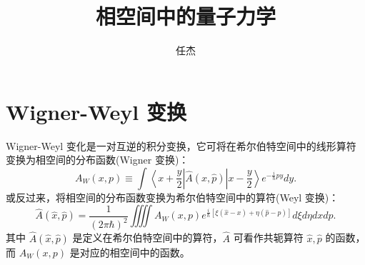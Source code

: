 \documentclass[10pt,UTF8]{ctexart}
\begin{document}
\title{相空间中的量子力学}
\author{任杰}
\date{}

\maketitle


\section*{Wigner-Weyl 变换}
\noindent
Wigner-Weyl 变化是一对互逆的积分变换，它可将在希尔伯特空间中的线形算符变换为相空间的分布函数(Wigner 变换)：
\begin{equation}
	A_W(x,p) \equiv \int \left\langle x+\frac{y}{2}\right|\hat A(\hat x,\hat p) \left|x-\frac{y}{2}\right\rangle e^{-\frac{i}{\hbar}py} dy.
\end{equation}
或反过来，将相空间的分布函数变换为希尔伯特空间中的算符(Weyl 变换)：
\begin{equation}
	\hat A(\hat x,\hat p) = \frac{1}{(2\pi \hbar)^2} \iiiint A_W(x,p) e^{\frac{i}{\hbar}[\xi(\hat x -x)+\eta(\hat p - p)]} d\xi d\eta dx dp.
\end{equation}
其中 $\hat A(\hat x,\hat p)$ 是定义在希尔伯特空间中的算符，$\hat A$ 可看作共轭算符 $\hat x, \hat p$ 的函数，而 $A_W(x,p)$ 是对应的相空间中的函数。
\end{document}
